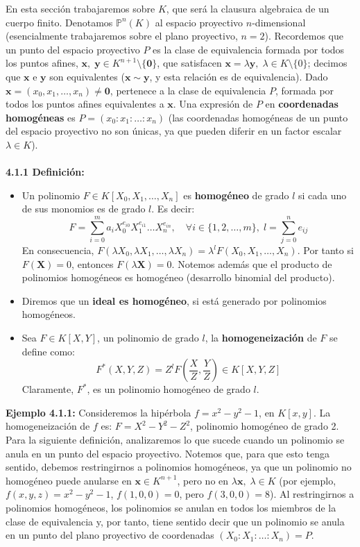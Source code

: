 \documentclass[11pt,spanish]{book}
\begin{document}
En esta sección trabajaremos sobre $K$, que será la clausura algebraica de un cuerpo finito. Denotamos $\mathbb{P}^{n}(K)$ al espacio proyectivo $n$-dimensional (esencialmente trabajaremos sobre el plano proyectivo, $n=2$). Recordemos que un punto del espacio proyectivo $P$ es la clase de equivalencia formada por todos los puntos afines, $\mathbf{x},\;\mathbf{y}\in K^{n+1}\setminus\{\mathbf{0}\}$, que satisfacen $\mathbf{x}=\lambda\mathbf{y},\;\lambda\in K\setminus\{0\}$; decimos que $\mathbf{x}$ e $\mathbf{y}$ son equivalentes ($\mathbf{x}\sim \mathbf{y}$, y esta relación es de equivalencia). Dado $\mathbf{x}=(x_0,x_1,\ldots, x_{n})\neq\mathbf{0}$, pertenece a la clase de equivalencia $P$, formada por todos los puntos afines equivalentes a $\mathbf{x}$. Una expresión de $P$ en \textbf{coordenadas homogéneas} es $P=(x_0:x_1:\ldots:x_n)$ (las coordenadas homogéneas de un punto del espacio proyectivo no son únicas, ya que pueden diferir en un factor escalar $\lambda\in K$).\\
\\ \textbf{4.1.1 Definición:}
\begin{itemize}
    \item Un polinomio $F\in K[X_0,X_1,\ldots, X_n]$ es \textbf{homogéneo} de grado $l$ si cada uno de sus monomios es de grado $l$. Es decir:
$$ F = \sum_{i=0}^{m} a_{i}X_{0}^{e_{i0}}X_{1}^{e_{i1}}\ldots X_{n}^{e_{in}},\quad \forall i\in \{1,2,\ldots, m\},\;l=\sum_{j=0}^{n}e_{ij} $$
En consecuencia, $F(\lambda X_0,\lambda X_1,\ldots,\lambda  X_n)=\lambda^{l}F(X_0,X_1,\ldots,X_n)$. Por tanto si $F(\mathbf{X})=0$, entonces $F(\lambda \mathbf{X})=0$. Notemos además que el producto de polinomios homogéneos es homogéneo (desarrollo binomial del producto).
    \item Diremos que un \textbf{ideal es homogéneo}, si está generado por polinomios homogéneos.  
    \item Sea $F\in K[X,Y]$, un polinomio de grado $l$, la \textbf{homogeneización} de $F$ se define como:
    $$F^{*}(X,Y,Z)=Z^l F(\frac{X}{Z},\frac{Y}{Z})\in K[X,Y,Z]$$
    Claramente, $F^*$, es un polinomio homogéneo de grado $l$.
\end{itemize}
\textbf{Ejemplo 4.1.1: } Consideremos la hipérbola $f=x^2-y^2-1$, en $K[x,y]$. La homogeneización de $f$ es: $F=X^2-Y^2-Z^2$, polinomio homogéneo de grado 2. \\

Para la siguiente definición, analizaremos lo que sucede cuando un polinomio se anula en un punto del espacio proyectivo. Notemos que, para que esto tenga sentido, debemos restringirnos a polinomios homogéneos, ya que un polinomio no homogéneo puede anularse en $\mathbf{x}\in K^{n+1}$, pero no en $\lambda \mathbf{x},\;\lambda\in K$ (por ejemplo, $f(x,y,z)=x^2-y^2-1$, $f(1,0,0)=0$, pero $f(3,0,0)= 8$). Al restringirnos a polinomios homogéneos, los polinomios se anulan en todos los miembros de la clase de equivalencia y, por tanto, tiene sentido decir que un polinomio se anula en un punto del plano proyectivo de coordenadas $(X_0:X_1:\ldots:X_n)=P$.\\
\end{document}
